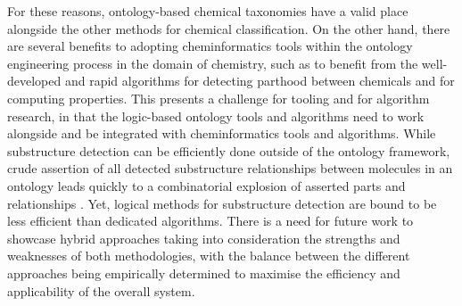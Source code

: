 \documentclass[10pt]{bmc_article}
\newenvironment{bmcformat}{\baselineskip20pt\sloppy\setboolean{publ}{false}}{\baselineskip20pt\sloppy}
\begin{document}
\begin{bmcformat}
For these reasons, ontology-based chemical taxonomies have a valid place alongside the other methods for chemical classification. On the other hand, there are several benefits to adopting cheminformatics tools within the ontology engineering process in the domain of chemistry, such as to benefit from the well-developed and rapid algorithms for detecting parthood between chemicals and for computing properties. This presents a challenge for tooling and for algorithm research, in that the logic-based ontology tools and algorithms need to work alongside and be integrated with cheminformatics tools and algorithms. While substructure detection can be efficiently done outside of the ontology framework, crude assertion of all detected substructure relationships between molecules in an ontology leads quickly to a combinatorial explosion of asserted parts and relationships \cite{hastingswomo2011}. Yet, logical methods for substructure detection are bound to be less efficient than dedicated algorithms. There is a need for future work to showcase hybrid approaches taking into consideration the strengths and weaknesses of both methodologies, with the balance between the different approaches being empirically determined to maximise the efficiency and applicability of the overall system. 


\end{bmcformat}
\end{document}
